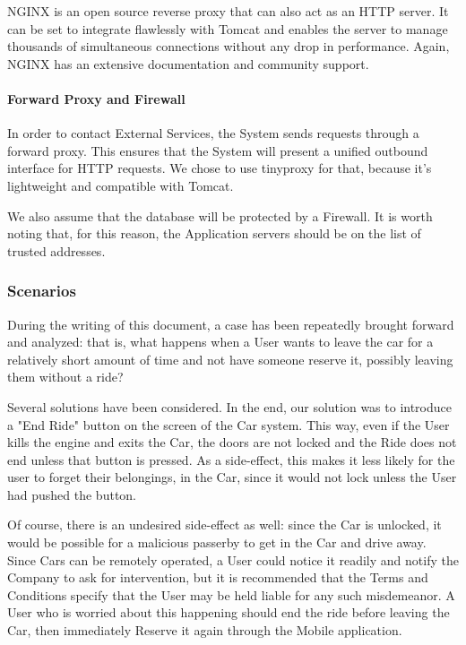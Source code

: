 \documentclass[12pt]{article}
\begin{document}
NGINX is an open source reverse proxy that can also act as an HTTP server. It can be set to integrate flawlessly with Tomcat and enables the server to manage thousands of simultaneous connections without any drop in performance. Again, NGINX has an extensive documentation and community support.

\paragraph{Forward Proxy and Firewall}
In order to contact External Services, the System sends requests through a forward proxy. This ensures that the System will present a unified outbound interface for HTTP requests. We chose to use tinyproxy for that, because it's lightweight and compatible with Tomcat.

We also assume that the database will be protected by a Firewall. It is worth noting that, for this reason, the Application servers should be on the list of trusted addresses.

\subsubsection{Scenarios}
During the writing of this document, a case has been repeatedly brought forward and analyzed: that is, what happens when a User wants to leave the car for a relatively short amount of time and not have someone reserve it, possibly leaving them without a ride?

Several solutions have been considered. In the end, our solution was to introduce a "End Ride" button on the screen of the Car system. This way, even if the User kills the engine and exits the Car, the doors are not locked and the Ride does not end unless that button is pressed. As a side-effect, this makes it less likely for the user to forget their belongings, in the Car, since it would not lock unless the User had pushed the button.

Of course, there is an undesired side-effect as well: since the Car is unlocked, it would be possible for a malicious passerby to get in the Car and drive away. Since Cars can be remotely operated, a User could notice it readily and notify the Company to ask for intervention, but it is recommended that the Terms and Conditions specify that the User may be held liable for any such misdemeanor. A User who is worried about this happening should end the ride before leaving the Car, then immediately Reserve it again through the Mobile application.
\end{document}
